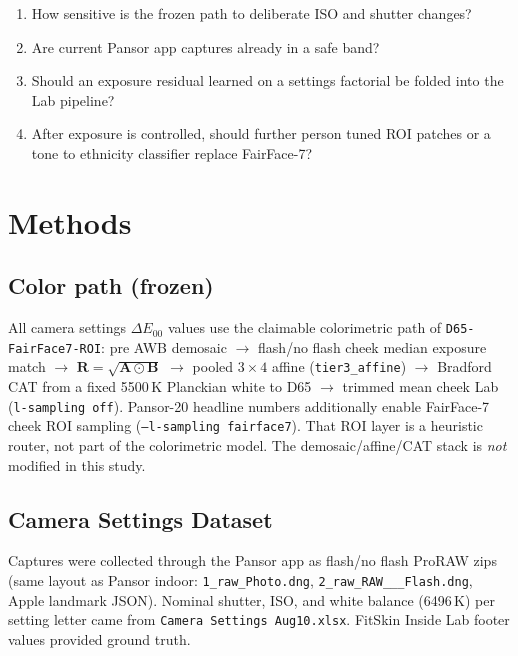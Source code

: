 \documentclass[11pt]{article}
\newcommand{\deee}{\ensuremath{\Delta E_{00}}}
\newcommand{\pipename}{\texttt{D65-FairFace7-ROI}}
\begin{document}
\begin{enumerate}[leftmargin=*,itemsep=2pt]
  \item How sensitive is the frozen path to deliberate ISO and shutter changes?
  \item Are current Pansor app captures already in a safe band?
  \item Should an exposure residual learned on a settings factorial be folded into the Lab pipeline?
  \item After exposure is controlled, should further person tuned ROI patches or a tone to ethnicity classifier replace FairFace-7?
\end{enumerate}

\section{Methods}

\subsection{Color path (frozen)}
All camera settings $\deee$ values use the claimable colorimetric path of \pipename{}:
pre AWB demosaic $\to$ flash/no flash cheek median exposure match $\to$
$\mathbf{R}=\sqrt{\mathbf{A}\odot\mathbf{B}}$ $\to$ pooled $3{\times}4$ affine
(\texttt{tier3\_affine}) $\to$ Bradford CAT from a fixed 5500\,K Planckian white to D65
$\to$ trimmed mean cheek Lab (\texttt{l-sampling off}).
Pansor-20 headline numbers additionally enable FairFace-7 cheek ROI sampling
(\texttt{--l-sampling fairface7}). That ROI layer is a heuristic router, not part of the colorimetric model.
The demosaic/affine/CAT stack is \emph{not} modified in this study.

\subsection{Camera Settings Dataset}
Captures were collected through the Pansor app as flash/no flash ProRAW zips (same layout as Pansor indoor: \texttt{1\_raw\_Photo.dng}, \texttt{2\_raw\_RAW\_\_\_Flash.dng}, Apple landmark JSON).
Nominal shutter, ISO, and white balance (6496\,K) per setting letter came from \texttt{Camera Settings Aug10.xlsx}. FitSkin Inside Lab footer values provided ground truth.
\end{document}
